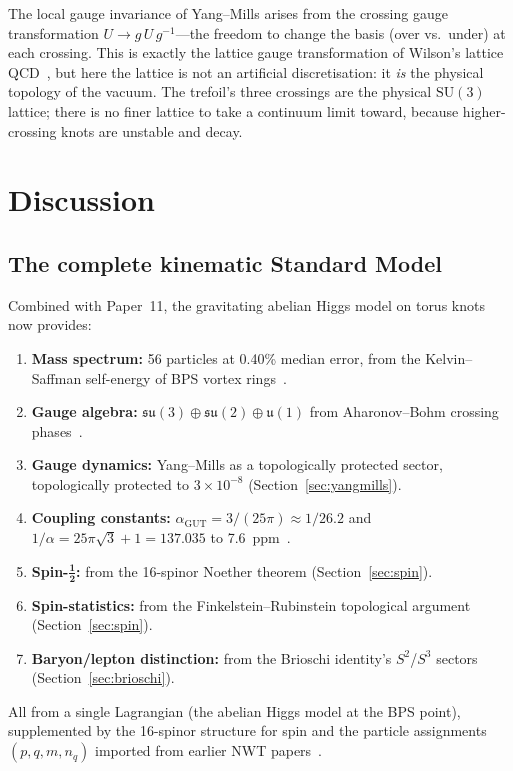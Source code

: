 \documentclass[11pt]{article}
\newcommand{\su}{\mathfrak{su}}
\newcommand{\uu}{\mathfrak{u}}
\newcommand{\half}{\tfrac{1}{2}}
\begin{document}
The local gauge invariance of Yang--Mills arises from the crossing
gauge transformation $U \to g\,U\,g^{-1}$---the freedom to change the
basis (over vs.\ under) at each crossing.  This is exactly the lattice
gauge transformation of Wilson's lattice QCD~\cite{Wilson1974}, but
here the lattice is not an artificial discretisation: it \emph{is} the
physical topology of the vacuum.  The trefoil's three crossings are
the physical $\mathrm{SU}(3)$ lattice; there is no finer lattice to
take a continuum limit toward, because higher-crossing knots are
unstable and decay.


\section{Discussion}
\label{sec:discussion}

\subsection{The complete kinematic Standard Model}

Combined with Paper~11, the gravitating abelian Higgs model on torus
knots now provides:
\begin{enumerate}
\item \textbf{Mass spectrum:} 56 particles at 0.40\% median error,
      from the Kelvin--Saffman self-energy of BPS vortex
      rings~\cite{NWT11}.
\item \textbf{Gauge algebra:}
      $\su(3) \oplus \su(2) \oplus \uu(1)$
      from Aharonov--Bohm crossing phases~\cite{NWT11,NWT8}.
\item \textbf{Gauge dynamics:} Yang--Mills as a topologically protected sector,
      topologically protected to $3 \times 10^{-8}$
      (Section~\ref{sec:yangmills}).
\item \textbf{Coupling constants:}
      $\alpha_\text{GUT} = 3/(25\pi) \approx 1/26.2$ and
      $1/\alpha = 25\pi\sqrt{3} + 1 = 137.035$ to
      7.6~ppm~\cite{NWT11}.
\item \textbf{Spin-$\boldsymbol{\half}$:} from the 16-spinor Noether
      theorem (Section~\ref{sec:spin}).
\item \textbf{Spin-statistics:} from the Finkelstein--Rubinstein
      topological argument (Section~\ref{sec:spin}).
\item \textbf{Baryon/lepton distinction:} from the Brioschi
      identity's $S^2$/$S^3$ sectors
      (Section~\ref{sec:brioschi}).
\end{enumerate}
All from a single Lagrangian (the abelian Higgs model at the BPS
point), supplemented by the 16-spinor structure for spin and the
particle assignments $(p,q,m,n_q)$ imported from earlier NWT
papers~\cite{NWT1,NWT6}.
\end{document}

